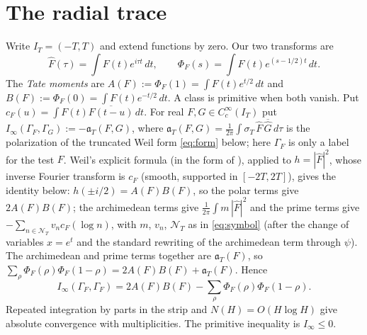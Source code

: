 \documentclass[10pt]{amsart}
\theoremstyle{definition}
\theoremstyle{remark}
\newcommand{\IT}{I_T}
\newcommand{\sT}{\sigma_T}
\newcommand{\Fh}{\widehat F}
\newcommand{\NT}{\mathcal N_T}
\begin{document}
\section{The radial trace}\label{sec:trace}
Write $I_T=(-T,T)$ and extend functions by zero. Our two transforms are
\[
 \widehat F(\tau)=\int F(t)e^{i\tau t}\,dt,\qquad
 \Phi_F(s)=\int F(t)e^{(s-1/2)t}\,dt .
\]
The \emph{Tate moments} are $A(F):=\Phi_F(1)=\int F(t)e^{t/2}\,dt$ and $B(F):=\Phi_F(0)=\int F(t)e^{-t/2}\,dt$.
A class is primitive when both vanish. Put
$c_F(u)=\int F(t)\overline{F(t-u)}\,dt$.
For real $F,G\in C_c^\infty(\IT)$ put $I_\infty(\Gamma_F,\Gamma_G):=-\mathfrak a_T(F,G)$, where
$\mathfrak a_T(F,G)=\frac1{2\pi}\int\sT\,\Fh\,\overline{\widehat G}\,d\tau$ is the polarization of the
truncated Weil form \eqref{eq:form} below; here $\Gamma_F$ is only a label for the test $F$.
Weil's explicit formula \cite{Weil52} (in the form of \cite[\S2, Explicit Formula, p.~186]{Bombieri2000}), applied to $h=|\Fh|^2$,
whose inverse Fourier transform is $c_F$ (smooth, supported in $[-2T,2T]$), gives the identity below:
$h(\pm i/2)=A(F)B(F)$, so the polar terms give $2A(F)B(F)$; the archimedean terms give
$\frac1{2\pi}\int m\,|\Fh|^2$ and the prime terms give $-\sum_{n\in\NT}v_n c_F(\log n)$, with $m$, $v_n$,
$\NT$ as in \eqref{eq:symbol} (after the change of variables $x=e^t$ and the standard rewriting of the
archimedean term through $\psi$). The archimedean and prime terms together are $\mathfrak a_T(F)$, so
$\sum_\rho\Phi_F(\rho)\Phi_F(1-\rho)=2A(F)B(F)+\mathfrak a_T(F)$. Hence
\begin{equation}\label{comparison}
 I_\infty(\Gamma_F,\Gamma_F)
 =2A(F)B(F)-\sum_\rho\Phi_F(\rho)\Phi_F(1-\rho).
\end{equation}
Repeated integration by parts in the strip and $N(H)=O(H\log H)$ give
absolute convergence with multiplicities. The primitive inequality is $I_\infty\le0$.
\end{document}
